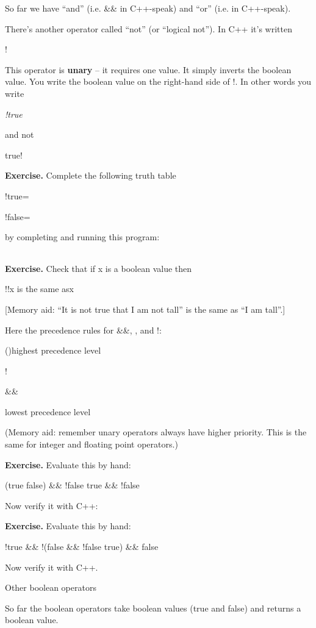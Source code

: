 \documentclass[
]{article}
\begin{document}
So far we have ``and'' (i.e. \&\& in C++-speak) and ``or'' (i.e.
\emph{\textbar\textbar{}} in C++-speak).

There's another operator called ``not'' (or ``logical not''). In C++
it's written

!

This operator is \textbf{unary} -- it requires one value. It simply
inverts the boolean value. You write the boolean value on the right-hand
side of !. In other words you write

\emph{!true }

and not

true!

\textbf{Exercise.} Complete the following truth table

!true=

!false=

by completing and running this program:

\begin{longtable}[]{@{}@{}}
\toprule
\endhead
\bottomrule
\end{longtable}

\textbf{Exercise.} Check that if x is a boolean value then

!!x is the same asx

{[}Memory aid: ``It is not true that I am not tall'' is the same as ``I
am tall''.{]}

Here the precedence rules for \&\&, \textbar\textbar, and !:

()highest precedence level

!

\&\&

\emph{\textbar\textbar{}}lowest precedence level

(Memory aid: remember unary operators always have higher priority. This
is the same for integer and floating point operators.)

\textbf{Exercise.} Evaluate this by hand:

(true \textbar\textbar{} false) \&\& !false \textbar\textbar{} true \&\&
!false

Now verify it with C++:

\textbf{Exercise.} Evaluate this by hand:

!true \&\& !(false \&\& !false \textbar\textbar{} true) \&\& false

Now verify it with C++.

Other boolean operators

So far the boolean operators take boolean values (true and false) and
returns a boolean value.
\end{document}
